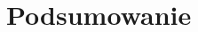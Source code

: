 \documentclass[12pt]{mwart}
\begin{document}
	
	
	

















	\newpage
	
	\section{Podsumowanie}
	
	
	
	\newpage
	\begin{thebibliography}{1}
		\url{}
	\end{thebibliography}
\end{document}
